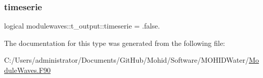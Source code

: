 \mbox{\label{structmodulewaves_1_1t__output_a6d49583d7426e16b1512d5a7b7e7de9c}} 
\subsubsection{\texorpdfstring{timeserie}{timeserie}}
{\footnotesize\ttfamily logical modulewaves\+::t\+\_\+output\+::timeserie = .false.\hspace{0.3cm}{\ttfamily [private]}}



The documentation for this type was generated from the following file\+:\begin{DoxyCompactItemize}
\item 
C\+:/\+Users/administrator/\+Documents/\+Git\+Hub/\+Mohid/\+Software/\+M\+O\+H\+I\+D\+Water/\mbox{\hyperlink{_module_waves_8_f90}{Module\+Waves.\+F90}}\end{DoxyCompactItemize}
